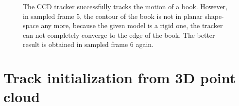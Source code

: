 \begin{figure}[htbp]
\begin{minipage}[t]{0.5\linewidth}
  \end{minipage} 
  \begin{minipage}[t]{0.5\linewidth} 
    \centering 
  \end{minipage} 
  \begin{minipage}[t]{0.5\linewidth} 
    \centering 
  \end{minipage} 
  \caption[The tracking result based on SIFT contour initialization]{The
    CCD tracker successfully tracks the motion of a book. However, in
    sampled frame  5, the contour of the book is not in planar shape-space
    any more, because the given model is a rigid one, the tracker can not
    completely converge to the edge of the book. The better result is
    obtained in sampled frame 6 again.
  }
  \label{fig:sifttracker}
\end{figure}


\section{Track initialization from 3D point cloud}
\label{sec:tifpc}

